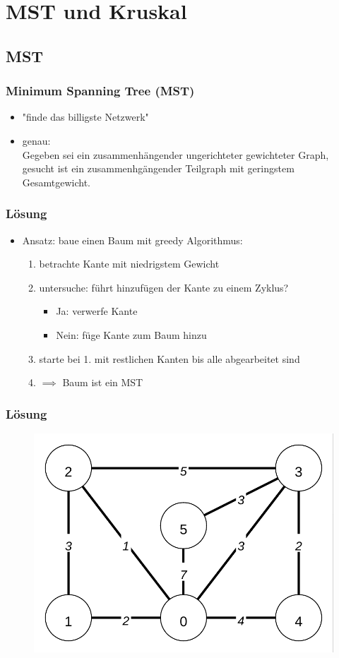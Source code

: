 \section{MST und Kruskal}
\subsection{MST}

\begin{frame}
\frametitle{Minimum Spanning Tree (MST)}
\begin{itemize}
\item "finde das billigste Netzwerk"
\item genau: \\
Gegeben sei ein zusammenhängender ungerichteter gewichteter Graph, gesucht ist ein zusammenhgängender Teilgraph mit geringstem Gesamtgewicht.
\end{itemize}
\end{frame}

\begin{frame}
\frametitle{Lösung}
\begin{itemize}
\item Ansatz: baue einen Baum mit greedy Algorithmus:
\begin{enumerate}
\item betrachte Kante mit niedrigstem Gewicht
\item untersuche: führt hinzufügen der Kante zu einem Zyklus?
\begin{itemize}
\item Ja: verwerfe Kante
\item Nein: füge Kante zum Baum hinzu
\end{itemize}
\item starte bei 1. mit restlichen Kanten bis alle abgearbeitet sind
\item $ \implies $ Baum ist ein MST
\end{enumerate}
\end{itemize}
\end{frame}

\begin{frame}
\frametitle{Lösung}
\begin{figure}
\includegraphics[width=0.75\linewidth]{kruskal_graphs/graph1.pdf}
\end{figure}
\end{frame}
